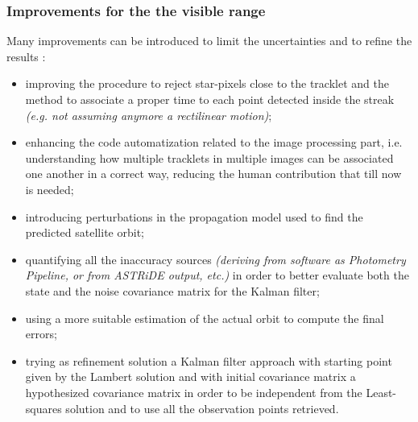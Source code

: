 \documentclass[11pt]{article}
\begin{document}
\subsubsection{Improvements for the the visible range \label{vr}}
 Many improvements can be introduced to limit the uncertainties and to refine
the results \cite{lavezzi}:
\begin{itemize}
    \item improving the procedure to reject star-pixels close to the tracklet and the
method to associate a proper time to each point detected inside the streak
\textit{(e.g. not assuming anymore a rectilinear motion)};
\item enhancing the code automatization related to the image processing part, i.e.
understanding how multiple tracklets in multiple images can be associated
one another in a correct way, reducing the human contribution that till now
is needed;
\item introducing perturbations in the propagation model used to find the predicted
satellite orbit;
\item quantifying all the inaccuracy sources \textit{(deriving from software as Photometry
Pipeline, or from ASTRiDE output, etc.) } in order to better evaluate both
the state and the noise covariance matrix for the Kalman filter;
\item using a more suitable estimation of the actual orbit to compute the final
errors;
\item trying as refinement solution a Kalman filter approach with starting point
given by the Lambert solution and with initial covariance matrix a hypothesized
covariance matrix in order to be independent from the Least-squares solution
and to use all the observation points retrieved.
\end{itemize}{}
\end{document}
